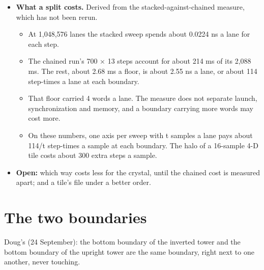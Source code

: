 \begin{itemize}
\begin{itemize}
\item One level of the whole grid costs 7.5 steps a sample for each axis plus one field step: 8.5, 16, 23.5 and 31 in 1 to 4 axes. The replica's grids add one constant for each line.
\item A tile recomputes its halo. In 4-D a 16-sample tile runs 331 steps a sample against the grid's 31.
\item In this order a tile's file passes 256 limbs at 512 samples in 3-D and 256 samples in 4-D.
\end{itemize}
\item \textbf{What a split costs.} Derived from the stacked-against-chained measure, which has not been rerun.

\begin{itemize}
\item At 1,048,576 lanes the stacked sweep spends about 0.0224 ns a lane for each step.
\item The chained run's 700 × 13 steps account for about 214 ms of its 2,088 ms. The rest, about 2.68 ms a floor, is about 2.55 ns a lane, or about 114 step-times a lane at each boundary.
\item That floor carried 4 words a lane. The measure does not separate launch, synchronization and memory, and a boundary carrying more words may cost more.
\item On these numbers, one axis per sweep with t samples a lane pays about 114/t step-times a sample at each boundary. The halo of a 16-sample 4-D tile costs about 300 extra steps a sample.
\end{itemize}
\item \textbf{Open:} which way costs less for the crystal, until the chained cost is measured apart; and a tile's file under a better order.
\end{itemize}

\section{\texorpdfstring{The two boundaries}{The two boundaries}}

Doug's (24 September): the bottom boundary of the inverted tower and the bottom boundary of the upright tower are the same boundary, right next to one another, never touching.

